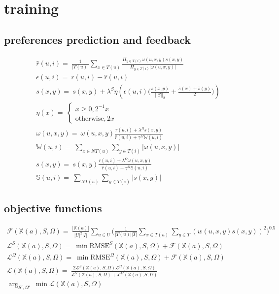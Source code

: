 \section{training}
\subsection{preferences prediction and feedback}
\begin{gather}
    \hat{r}(u,i)=~ \frac{1}{|T(u)|}\sum_{x \in T(u)}\frac{\Pi_{y \in T(i)} \omega(u,x,y)s(x,y)}{\Pi_{y \in T(i)}|\omega(u,x,y)|} \\
    \epsilon(u,i) =~ r(u,i) - \hat{r}(u,i) \\
    s(x,y)=~ s(x,y)+\lambda^{S}
    \eta \left(\epsilon(u,i)
    \Big(\frac{s(x,y)}{||S||_{2}}
    +\frac{\bar{s}(x)+\bar{s}(y)}{2}
    \Big) \right) \\
    \eta(x)=~ \begin{cases}
    x \geq 0,  2^{-1}x \\
    \text{otherwise},  2x
    \end{cases} \\
    \omega(u,x,y)=~ \omega(u,x,y)
    \frac{r(u,i)+\lambda^{\Omega} s(x,y)}
    {\hat{r}(u,i)+\gamma^{\Omega}\mathbb{W}(u,i)} \\
    \mathbb{W}(u,i)=~ \sum_{x\in NT(u)}\sum_{y \in T(i)} |\omega(u,x,y)| \\
    s(x,y)=~ s(x,y)\frac
    {r(u,i)+\lambda^{\Omega}\omega(u,x,y)}
    {\hat{r}(u,i) +\gamma^{\Omega}\mathbb{S}(u,i)} \\
    \mathbb{S}(u,i)=~ \sum_{NT(u)}\sum_{y \in T(i)} |s(x,y)|
\end{gather}

\subsection{objective functions}
\begin{gather}
    \mathcal{F}(\mathbb{X}(a), S, \Omega)=~ \frac{|\mathbb{X}(a)|}{|U|^{2} |I|} \sum_{u \in U}\big( \frac{1}{|T(u)||T|} \sum_{x \in T(u)} \sum_{y \in T} \left( w(u,x,y)s(x,y) \right)^{2} \big)^{0.5} \\
    \mathcal{L}^{S}(\mathbb{X}(a), S, \Omega) =~ \min \text{RMSE}^{S}(\mathbb{X}(a), S, \Omega) + \mathcal{F}(\mathbb{X}(a), S, \Omega) \\
    \mathcal{L}^{\Omega}(\mathbb{X}(a), S, \Omega) =~ \min \text{RMSE}^{\Omega}(\mathbb{X}(a), S, \Omega) + \mathcal{F}(\mathbb{X}(a), S, \Omega) \\
    \mathcal{L}(\mathbb{X}(a), S, \Omega) 
        =~ \frac{2 \mathcal{L}^{S}(\mathbb{X}(a), S, \Omega) \mathcal{L}^{\Omega}(\mathbb{X}(a), S, \Omega)}
        {\mathcal{L}^{S}(\mathbb{X}(a), S, \Omega) + \mathcal{L}^{\Omega}(\mathbb{X}(a), S, \Omega)} \\
    \arg_{S', \Omega'}~ \min \mathcal{L}(\mathbb{X}(a), S, \Omega) \label{eq:obj_func}
\end{gather}